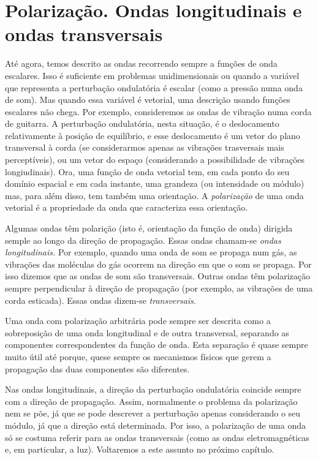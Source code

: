 \section{Polarização. Ondas longitudinais e ondas transversais}
\label{sec:polariz1}
Até agora, temos descrito as ondas recorrendo sempre a funções de onda
escalares. Isso é suficiente em problemas unidimensionais ou quando a variável
que representa a perturbação ondulatória é escalar (como a pressão numa onda de
som). Mas quando essa variável é vetorial, uma descrição usando funções escalares
não chega. Por exemplo, consideremos as ondas de vibração numa corda de
guitarra. A perturbação ondulatória, nesta situação, é o deslocamento
relativamente à posição de equilíbrio, e esse deslocamento é um vetor do plano
transversal à corda (se considerarmos apenas as vibrações trasversais mais
perceptíveis), ou um vetor do espaço (considerando a possibilidade de vibrações
longiudinais).  Ora, uma função de onda vetorial tem, em cada ponto do seu
domínio espacial e em cada instante, uma grandeza (ou intensidade ou módulo)
mas, para além disso, tem também uma orientação. A \emph{polarização} de uma
onda vetorial é a propriedade da onda que caracteriza essa orientação.  

Algumas ondas têm polarição (isto é, orientação da função de onda) dirigida
semple ao longo da direção de propagação. Essas ondas chamam-se \emph{ondas
longitudinais.} Por exemplo, quando uma onda de som se propaga num gás, as
vibrações das moléculas do gás ocorrem na direção em que o som se propaga. Por
isso dizemos que as ondas de som são transversais. Outras ondas têm polarização
sempre perpendicular à direção de propagação (por exemplo, as vibrações de uma
corda esticada). Essas ondas dizem-se \emph{transversais}.

Uma onda com polarização arbitrária pode sempre ser descrita como a sobreposição
de uma onda longitudinal e de outra transversal, separando as componentes
correspondentes da função de onda. Esta separação é quase sempre muito útil até
porque, quese sempre os mecanismos físicos que gerem a propagação das duas
componentes são diferentes.

Nas ondas longitudinais, a direção da perturbação ondulatória coincide sempre
com a direção de propagação. Assim, normalmente o problema da polarização nem
se põe, já que se pode descrever a perturbação apenas considerando o seu módulo,
já que a direção está determinada. Por isso, a polarização de uma onda só se
costuma referir para as ondas transversais (como as ondas eletromagnéticas e, em
particular, a luz). Voltaremos a este assunto no próximo capítulo.


